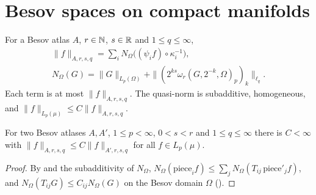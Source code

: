 \section{Besov spaces on compact manifolds}
\label{sec:manifold-besov}

\begin{definition}
\label{def:manifold-besov-norm}
\leanok
{}
For a Besov atlas $A$, $r \in \mathbb{N}$, $s \in \mathbb{R}$ and $1 \leq q \leq \infty$,
\begin{gather*}
  \|f\|_{A, r, s, q} = \sum_i N_\Omega\bigl((\psi_i f) \circ \kappa_i^{-1}\bigr), \\
  N_\Omega(G) = \|G\|_{L_p(\Omega)} + \|(2^{ks} \omega_r(G, 2^{-k}, \Omega)_p)_k\|_{\ell_q} .
\end{gather*}
Each term is at most $\|f\|_{A, r, s, q}$. The quasi-norm is subadditive, homogeneous, and
$\|f\|_{L_p(\mu)} \leq C \|f\|_{A, r, s, q}$.
\end{definition}

\begin{theorem}
\label{thm:atlas-independence}
\leanok
{}
For two Besov atlases $A, A'$, $1 \leq p < \infty$, $0 < s < r$ and $1 \leq q \leq \infty$ there
is $C < \infty$ with $\|f\|_{A, r, s, q} \leq C \|f\|_{A', r, s, q}$ for all $f \in L_p(\mu)$.
\end{theorem}

\begin{proof}
\leanok
By  and the subadditivity of $N_\Omega$,
$N_\Omega(\text{piece}_i f) \leq \sum_j N_\Omega(T_{ij}\, \text{piece}'_j f)$, and
$N_\Omega(T_{ij} G) \leq C_{ij} N_\Omega(G)$ on the Besov domain $\Omega$
().
\end{proof}

